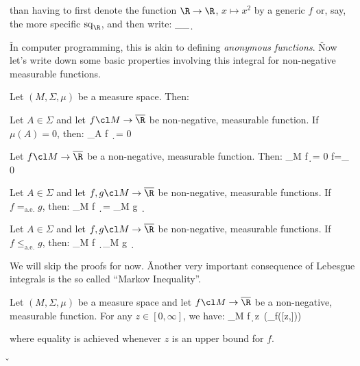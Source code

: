than having to first denote the function $\R\to\R$, $x\mapsto x^2$ by a generic $f$ or, say, the more specific
$\mathrm{sq}_{\R}$, and then write:
\bse
\int_\R{}_{\R}\, \d \mu
\ese

\v

In computer programming, this is akin to defining \emph{anonymous functions}. \v

Now let's write down some basic properties involving this integral for non-negative measurable functions.

\bt[]
Let $(M,\Sigma,\mu)$ be a measure space. Then:
\ben[label=(\roman*)]
\item Let $A\in\Sigma$ and let $f\cl M\to\overline{\R}$ be non-negative, measurable function. If $\mu(A)=0$, then:
\bse
\displaystyle\int_A\! f \, \d \mu = 0
\ese

\item Let $f\cl M\to\overline{\R}$ be a non-negative, measurable function. Then:
\bse
\int_M\! f\, \d \mu = 0 \quad \Leftrightarrow \quad f=_{} 0
\ese

\item Let $A\in\Sigma$ and let $f,g\cl M\to\overline{\R}$ be non-negative, measurable functions. If
$f=_{\mathrm{a.e.}} g$, then:
\bse
\displaystyle\int_M\! f \, \d \mu = \int_M\! g \, \d \mu
\ese

\item Let $A\in\Sigma$ and let $f,g\cl M\to\overline{\R}$ be non-negative, measurable functions. If
$f\leq_{\mathrm{a.e.}}g$, then:
\bse
\displaystyle\int_M\! f \, \d \mu \leq \int_M\! g \, \d \mu
\ese
\een
\et

We will skip the proofs for now. \v

Another very important consequence of Lebesgue integrals is the so called ``Markov Inequality''.

Let $(M,\Sigma,\mu)$ be a measure space and let $f\cl M\to\overline{\R}$ be a non-negative, measurable function. For
any $z\in [0,\infty]$, we have:
\bse
\int_M\! f\, \d \mu \geq z\, \mu(\preim_f([z,\infty]))
\ese

where equality is achieved whenever $z$ is an upper bound for $f$.
\et

\v

\begin{center}
\end{center}

